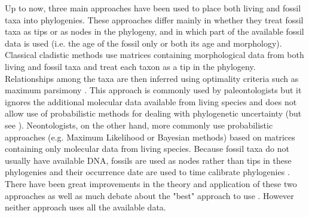 \documentclass[12pt,letterpaper]{article}
\begin{document}
Up to now, three main approaches have been used to place both living and fossil taxa %
    into phylogenies.
These approaches differ mainly in whether they treat fossil taxa as tips or as nodes in the phylogeny, and in which part of the available fossil data is used (i.e. the age of the fossil only or both its age and morphology). %
Classical cladistic methods use matrices containing morphological data from both living and fossil taxa and treat each taxon as a tip in the phylogeny.
Relationships among the taxa are then inferred using optimality criteria such as maximum parsimony \citep{simpson1945}.
This approach is commonly used by paleontologists but it ignores the additional molecular data available from living species and does not allow use of probabilistic methods for dealing with phylogenetic uncertainty (but see \citealp{spencerefficacy2013}).
Neontologists, on the other hand, more commonly use probabilistic approaches (e.g. Maximum Likelihood or Bayesian methods) based on matrices containing only molecular data from living species.
Because fossil taxa do not usually have available DNA, fossils are used as nodes rather than tips in these phylogenies and their occurrence date %
    are used to time calibrate phylogenies \citep{zuckerkandl1965}.
There have been great improvements in the theory and application of these two approaches \citep[e.g.][]{bapsta2013,stadlerdating2013,heaththe2013} as well as much debate about the "best" approach to use \citep[e.g.][]{spencerefficacy2013}.
However neither approach uses all the available data.
\end{document}
